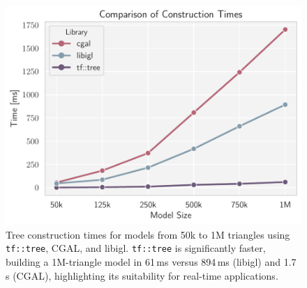 \begin{figure}[!t]
\includegraphics[width=\linewidth]{../figures/libraries-cons.pdf}
\caption{
Tree construction times for models from 50k to 1M triangles using \texttt{tf::tree}, CGAL, and libigl.
\texttt{tf::tree} is significantly faster, building a 1M-triangle model in 61\,ms versus 894\,ms (libigl) and 1.7\,s (CGAL),
highlighting its suitability for real-time applications.
}
\label{fig:lib-comparison}
\end{figure}
